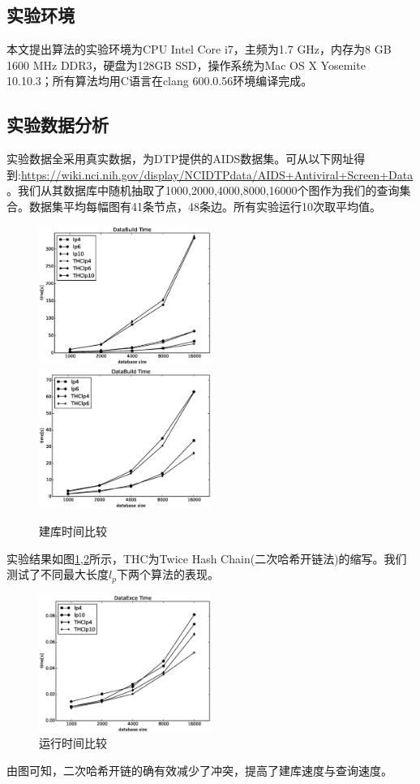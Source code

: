 \documentclass{XDBAthesis}
\numberwithin{algorithm}{chapter}
\begin{document}
\subsection{实验环境}
本文提出算法的实验环境为CPU Intel Core i7，主频为1.7 GHz，内存为8 GB 1600 MHz DDR3，硬盘为128GB SSD，操作系统为Mac OS X Yosemite 10.10.3；所有算法均用C语言在clang 600.0.56环境编译完成。
\subsection{实验数据分析}
实验数据全采用真实数据，为DTP提供的AIDS数据集。可从以下网址得到:\url{https://wiki.nci.nih.gov/display/NCIDTPdata/AIDS+Antiviral+Screen+Data}。我们从其数据库中随机抽取了1000,2000,4000,8000,16000个图作为我们的查询集合。数据集平均每幅图有41条节点，48条边。所有实验运行10次取平均值。
\begin{figure}[htb]
    \centering
    \includegraphics[width=0.5\textwidth]{../figures/THC/BuildCompare_4_6_10}%
    \includegraphics[width=0.5\textwidth]{../figures/THC/BuildCompare_4_6}
    \caption{建库时间比较}
    \label{fg:THCBuild}
\end{figure}

实验结果如图\ref{fg:THCBuild},\ref{fg:THCRun}所示，THC为Twice Hash Chain(二次哈希开链法)的缩写。我们测试了不同最大长度$l_p $下两个算法的表现。

\begin{figure}[htb]
    \centering
    \includegraphics[width=0.5\textwidth]{../figures/THC/ExceCompare_4_10}
    \caption{运行时间比较}
    \label{fg:THCRun}
\end{figure}

由图可知，二次哈希开链的确有效减少了冲突，提高了建库速度与查询速度。

\ifx\allfiles\undefined


\end{document}
